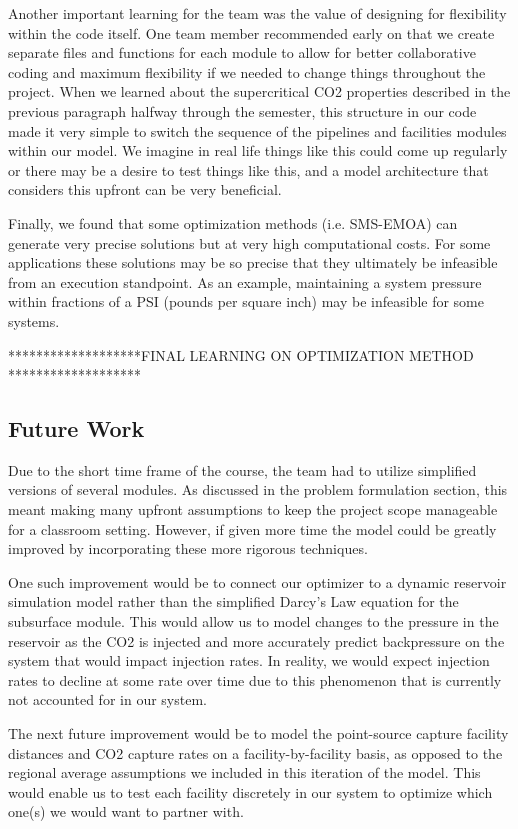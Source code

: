 \documentclass[balance,upint,subscriptcorrection,varvw,mathalfa=cal=boondoxo,spanish,french,vietnamese,russian,greek,pdf-a,colorlinks]{asmeconf}
\begin{document}
Another important learning for the team was the value of designing for flexibility within the code itself. One team member recommended early on that we create separate files and functions for each module to allow for better collaborative coding and maximum flexibility if we needed to change things throughout the project. When we learned about the supercritical CO2 properties described in the previous paragraph halfway through the semester, this structure in our code made it very simple to switch the sequence of the pipelines and facilities modules within our model. We imagine in real life things like this could come up regularly or there may be a desire to test things like this, and a model architecture that considers this upfront can be very beneficial.

Finally, we found that some optimization methods (i.e. SMS-EMOA) can generate very precise solutions but at very high computational costs.  For some applications these solutions may be so precise that they ultimately be infeasible from an execution standpoint.  As an example, maintaining a system pressure within fractions of a PSI (pounds per square inch) may be infeasible for some systems.

*******************FINAL LEARNING ON OPTIMIZATION METHOD *******************

\subsection{Future Work}
Due to the short time frame of the course, the team had to utilize simplified versions of several modules. As discussed in the problem formulation section, this meant making many upfront assumptions to keep the project scope manageable for a classroom setting. However, if given more time the model could be greatly improved by incorporating these more rigorous techniques.

One such improvement would be to connect our optimizer to a dynamic reservoir simulation model rather than the simplified Darcy's Law equation for the subsurface module. This would allow us to model changes to the pressure in the reservoir as the CO2 is injected and more accurately predict backpressure on the system that would impact injection rates. In reality, we would expect injection rates to decline at some rate over time due to this phenomenon that is currently not accounted for in our system.

The next future improvement would be to model the point-source capture facility distances and CO2 capture rates on a facility-by-facility basis, as opposed to the regional average assumptions we included in this iteration of the model. This would enable us to test each facility discretely in our system to optimize which one(s) we would want to partner with.
\end{document}
